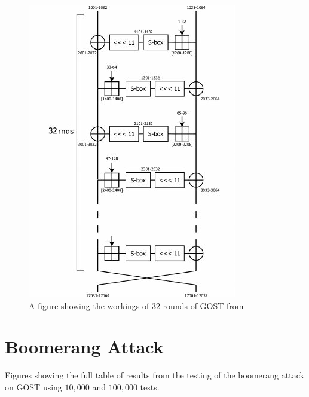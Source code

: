 \documentclass[10pt,journal,compsoc]{IEEEtran}
\begin{document}
\begin{appendices}
\begin{figure}[H]
    \centering
    \includegraphics[width=\linewidth, height=\textheight, keepaspectratio]{Figures/gost_32r.png}
    \caption{A figure showing the workings of 32 rounds of GOST from \cite{article-g32}}
    \label{fig:gost32r}
\end{figure}

\newpage
\section{Boomerang Attack}\label{Figures/appendix:boomerang}

Figures showing the full table of results from the testing of the boomerang attack on GOST using \(10,000\) and \(100,000\) tests.


\end{appendices}
\end{document}
